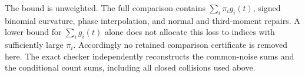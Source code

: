 \documentclass[11pt,a4paper]{article}
\begin{document}
The bound is unweighted. The full comparison contains
$\sum_i\pi_i g_i(t)$, signed binomial curvature, phase interpolation, and
normal and third-moment repairs. A lower bound for $\sum_i g_i(t)$ alone
does not allocate this loss to indices with sufficiently large $\pi_i$.
Accordingly no retained comparison certificate is removed here.
The exact checker independently reconstructs the common-noise sums and
the conditional count sums, including all closed collisions used above.
\end{document}
